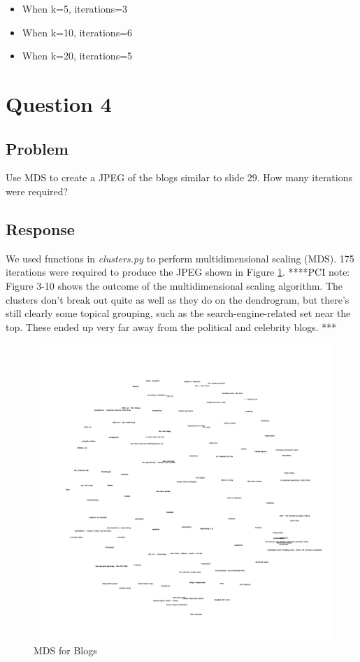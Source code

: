 \documentclass[letterpaper,11pt]{report}
\begin{document}
\begin{savenotes}
\begin{itemize}
\item When k=5, iterations=3
\item When k=10, iterations=6
\item When k=20, iterations=5
\end{itemize}

\section{Question 4}
\subsection{Problem}Use MDS to create a JPEG of the blogs similar to slide 29.  How many iterations were required?

\subsection{Response}We used functions in \emph{clusters.py} to perform multidimensional scaling (MDS). 175 iterations were required to produce the JPEG shown in Figure \ref{fig:blogs2d}.
****PCI note: Figure 3-10 shows the outcome of the multidimensional scaling algorithm. The clusters don’t break out quite as well as they do on the dendrogram, but there’s still clearly  some  topical  grouping,  such  as  the  search-engine-related  set  near  the  top. These ended up very far away from the political and celebrity blogs. ***

\begin{figure}[htbp]
	\centering
		\includegraphics[width=1.00\textwidth]{blogs2d.jpg}
	\caption{MDS for Blogs}
	\label{fig:blogs2d}
\end{figure}


\end{savenotes}
\end{document}
